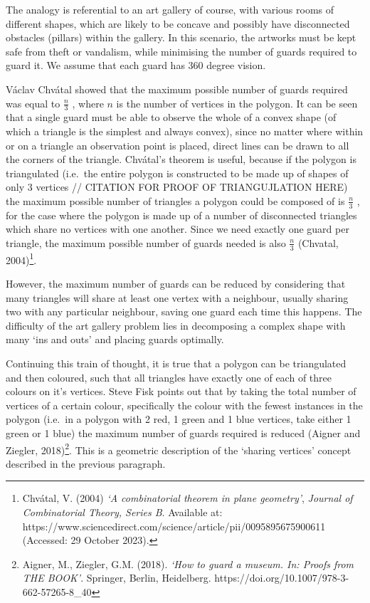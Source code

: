 \documentclass[
]{article}
\begin{document}
The analogy is referential to an art gallery of course, with various
rooms of different shapes, which are likely to be concave and possibly
have disconnected obstacles (pillars) within the gallery. In this
scenario, the artworks must be kept safe from theft or vandalism, while
minimising the number of guards required to guard it. We assume that
each guard has 360 degree vision.

Václav Chvátal showed that the maximum possible number of guards
required was equal to \(\frac{n}{3}\) , where \(n\) is the number of
vertices in the polygon. It can be seen that a single guard must be able
to observe the whole of a convex shape (of which a triangle is the
simplest and always convex), since no matter where within or on a
triangle an observation point is placed, direct lines can be drawn to
all the corners of the triangle. Chvátal's theorem is useful, because if
the polygon is triangulated (i.e.~the entire polygon is constructed to
be made up of shapes of only 3 vertices // CITATION FOR PROOF OF
TRIANGUJLATION HERE) the maximum possible number of triangles a polygon
could be composed of is \(\frac{n}{3}\) , for the case where the polygon
is made up of a number of disconnected triangles which share no vertices
with one another. Since we need exactly one guard per triangle, the
maximum possible number of guards needed is also \(\frac{n}{3}\)
(Chvatal, 2004)\footnote{Chvátal, V. (2004) \emph{`A combinatorial
  theorem in plane geometry'}, \emph{Journal of Combinatorial Theory,
  Series B}. Available at:
  https://www.sciencedirect.com/science/article/pii/0095895675900611
  (Accessed: 29 October 2023).}.

However, the maximum number of guards can be reduced by considering that
many triangles will share at least one vertex with a neighbour, usually
sharing two with any particular neighbour, saving one guard each time
this happens. The difficulty of the art gallery problem lies in
decomposing a complex shape with many `ins and outs' and placing guards
optimally.

Continuing this train of thought, it is true that a polygon can be
triangulated and then coloured, such that all triangles have exactly one
of each of three colours on it's vertices. Steve Fisk points out that by
taking the total number of vertices of a certain colour, specifically
the colour with the fewest instances in the polygon (i.e.~in a polygon
with 2 red, 1 green and 1 blue vertices, take either 1 green or 1 blue)
the maximum number of guards required is reduced (Aigner and Ziegler,
2018)\footnote{Aigner, M., Ziegler, G.M. (2018). \emph{`How to guard a
  museum. In: Proofs from THE BOOK'}. Springer, Berlin, Heidelberg.
  https://doi.org/10.1007/978-3-662-57265-8\_40}. This is a geometric
description of the `sharing vertices' concept described in the previous
paragraph.
\end{document}
